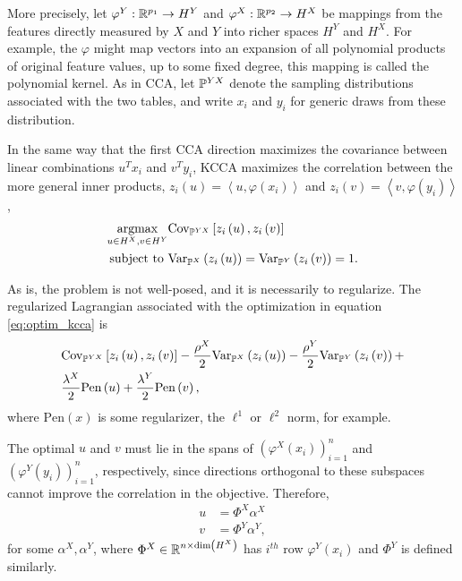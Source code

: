 \documentclass[14pt]{extarticle}
\begin{document}
More precisely, let $\varphi^{Y}: \reals^{p_{1}} \to H^{Y}$ and $\varphi^{X}:
\reals^{p_{2}} \to H^{X}$ be mappings from the features directly measured by $X$
and $Y$ into richer spaces $H^{Y}$ and $H^{X}$. For example, the $\varphi$ might
map vectors into an expansion of all polynomial products of original feature
values, up to some fixed degree, this mapping is called the polynomial kernel.
As in CCA, let $\P^{YX}$ denote the sampling distributions associated with the
two tables, and write $x_{i}$ and $y_{i}$ for generic draws from these
distribution.

In the same way that the first CCA direction maximizes the covariance between
linear combinations $u^{T}x_{i}$ and $v^{T}y_{i}$, KCCA maximizes the
correlation between the more general inner products, $z_{i}\left(u\right) =
\left<u, \varphi\left(x_{i}\right)\right>$ and $z_{i}\left(v\right) = \left<v,
\varphi\left(y_{i}\right)\right>$,
\begin{align}
  \argmax_{u \in H^{X}, v \in H^{Y}}
  &\Covsubarg{\P^{YX}}{z_{i}\left(u\right), z_{i}\left(v\right)} \label{eq:optim_kcca}\\
\text{subject to } &\Varsubarg{\P^{X}}{z_{i}\left(u\right)} = \Varsubarg{\P^{Y}}{z_{i}\left(v\right)} = 1. \nonumber
\end{align}

As is, the problem is not well-posed, and it is necessarily to regularize. The
regularized Lagrangian associated with the optimization in equation
\ref{eq:optim_kcca} is
\begin{align}
  &\Covsubarg{\P^{YX}}{z_{i}\left(u\right), z_{i}\left(v\right)} -
  \frac{\rho^{X}}{2}\Varsubarg{\P^{X}}{z_{i}\left(u\right)} -
  \frac{\rho^{Y}}{2}\Varsubarg{\P^{Y}}{z_{i}\left(v\right)} + \label{eq:lagrangian_kcca}\\
  &\frac{\lambda^{X}}{2}\text{Pen}\left(u\right) + \frac{\lambda^{Y}}{2}\text{Pen}\left(v\right), \nonumber
\end{align}
where $\text{Pen}\left(x\right)$ is some regularizer, the $\ell^{1}$ or
$\ell^{2}$ norm, for example.

The optimal $u$ and $v$ must lie in the spans of
$\left(\varphi^{X}\left(x_{i}\right)\right)_{i =1 }^{n}$ and
$\left(\varphi^{Y}\left(y_{i}\right)\right)_{i =1 }^{n}$, respectively, since
directions orthogonal to these subspaces cannot improve the correlation in the
objective. Therefore,
\begin{align*}
u &= \Phi^{X} \alpha^{X} \\
v &= \Phi^{Y} \alpha^{Y},
\end{align*}
for some $\alpha^{X}, \alpha^{Y}$, where $\Phi^{X} \in \reals^{n \times
  \text{dim}\left(H^{X}\right)}$ has $i^{th}$ row
$\varphi^{Y}\left(x_{i}\right)$ and $\Phi^{Y}$ is defined similarly.
\end{document}
